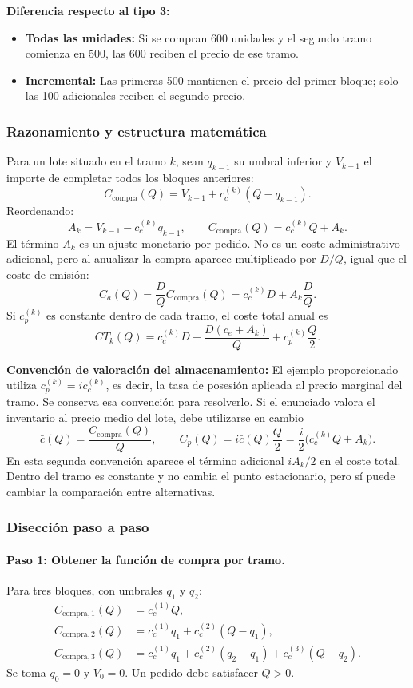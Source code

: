 \documentclass[11pt,a4paper]{article}
\begin{document}
\textbf{Diferencia respecto al tipo 3:}
\begin{itemize}
    \item \textbf{Todas las unidades:} Si se compran 600 unidades y el segundo tramo comienza en 500, las 600 reciben el precio de ese tramo.
    \item \textbf{Incremental:} Las primeras 500 mantienen el precio del primer bloque; solo las 100 adicionales reciben el segundo precio.
\end{itemize}

\subsubsection{Razonamiento y estructura matemática}
Para un lote situado en el tramo $k$, sean $q_{k-1}$ su umbral inferior y $V_{k-1}$ el importe de completar todos los bloques anteriores:
\[
    C_{\text{compra}}(Q)=V_{k-1}+c_c^{(k)}(Q-q_{k-1}).
\]
Reordenando:
\[
    A_k=V_{k-1}-c_c^{(k)}q_{k-1},
    \qquad
    C_{\text{compra}}(Q)=c_c^{(k)}Q+A_k.
\]
El término $A_k$ es un ajuste monetario por pedido. No es un coste administrativo adicional, pero al anualizar la compra aparece multiplicado por $D/Q$, igual que el coste de emisión:
\[
    C_a(Q)=\frac{D}{Q}C_{\text{compra}}(Q)
    =c_c^{(k)}D+A_k\frac{D}{Q}.
\]
Si $c_p^{(k)}$ es constante dentro de cada tramo, el coste total anual es
\[
    CT_k(Q)=c_c^{(k)}D+\frac{D(c_e+A_k)}{Q}
    +c_p^{(k)}\frac{Q}{2}.
\]

\textbf{Convención de valoración del almacenamiento:} El ejemplo proporcionado utiliza $c_p^{(k)}=i c_c^{(k)}$, es decir, la tasa de posesión aplicada al precio marginal del tramo. Se conserva esa convención para resolverlo. Si el enunciado valora el inventario al precio medio del lote, debe utilizarse en cambio
\[
    \bar{c}(Q)=\frac{C_{\text{compra}}(Q)}{Q},
    \qquad
    C_p(Q)=i\bar{c}(Q)\frac{Q}{2}
    =\frac{i}{2}\bigl(c_c^{(k)}Q+A_k\bigr).
\]
En esta segunda convención aparece el término adicional $iA_k/2$ en el coste total. Dentro del tramo es constante y no cambia el punto estacionario, pero sí puede cambiar la comparación entre alternativas.

\subsubsection{Disección paso a paso}
\paragraph{Paso 1: Obtener la función de compra por tramo.}
Para tres bloques, con umbrales $q_1$ y $q_2$:
\begin{align*}
    C_{\text{compra},1}(Q) & =c_c^{(1)}Q,                     \\
    C_{\text{compra},2}(Q) & =c_c^{(1)}q_1+c_c^{(2)}(Q-q_1),  \\
    C_{\text{compra},3}(Q) & =c_c^{(1)}q_1+c_c^{(2)}(q_2-q_1)
    +c_c^{(3)}(Q-q_2).
\end{align*}
Se toma $q_0=0$ y $V_0=0$. Un pedido debe satisfacer $Q>0$.
\end{document}
